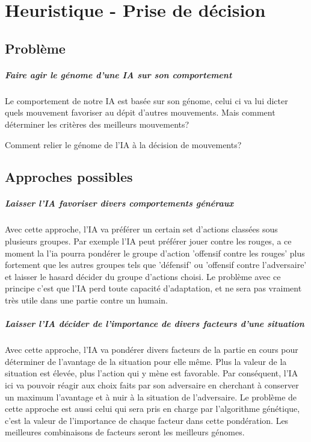\documentclass{scrreprt}
\begin{document}
	
	
	\chapter{Heuristique - Prise de décision}
			
		\section{Problème}
			
			\paragraph{Faire agir le génome d'une IA sur son comportement}
			
			Le comportement de notre IA est basée sur son génome, celui ci va lui dicter quels mouvement favoriser au dépit d'autres mouvements. Mais comment déterminer les critères des meilleurs mouvements?
			
			Comment relier le génome de l'IA à la décision de mouvements?
			
		\section{Approches possibles}
			\paragraph{Laisser l'IA favoriser divers comportements généraux}
			
			Avec cette approche, l'IA va préférer un certain set d'actions classées sous plusieurs groupes. Par exemple l'IA peut préférer jouer contre les rouges, a ce moment la l'ia pourra pondérer le groupe d'action 'offensif contre les rouges' plus fortement que les autres groupes tels que 'défensif' ou 'offensif contre l'adversaire' et laisser le hasard décider du groupe d'actions choisi. Le problème avec ce principe c'est que l'IA perd toute capacité d'adaptation, et ne sera pas vraiment très utile dans une partie contre un humain.
			
			\paragraph{Laisser l'IA décider de l'importance de divers facteurs d'une situation}
			
			Avec cette approche, l'IA va pondérer divers facteurs de la partie en cours pour déterminer de l'avantage de la situation pour elle même. Plus la valeur de la situation est élevée, plus l'action qui y mène est favorable. Par conséquent, l'IA ici va pouvoir réagir aux choix faits par son adversaire en cherchant à conserver un maximum l'avantage et à nuir à la situation de l'adversaire. Le problème de cette approche est aussi celui qui sera pris en charge par l'algorithme génétique, c'est la valeur de l'importance de chaque facteur dans cette pondération. Les meilleures combinaisons de facteurs seront les meilleurs génomes.   
			
\end{document}
